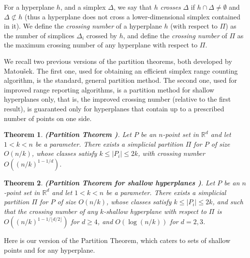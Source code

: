 \documentclass[11pt]{article}
\newtheorem{theorem}{Theorem}[section]
\def\reals{\mathbb R}
\begin{document}
For a hyperplane $h$, and a simplex $\Delta$, we say that $h$ \emph{crosses} $\Delta$ if $h \cap \Delta \neq \emptyset$ and $\Delta \not \subset h$ (thus a hyperplane does not cross a lower-dimensional simplex contained in it). We define the \emph{crossing number} of a hyperplane $h$ (with respect to $\Pi$) as the number of simplices $\Delta_{i}$ crossed by $h$, and define the \emph{crossing number} of $\Pi$ as the maximum crossing number of any hyperplane with respect to $\Pi$.


We recall two previous versions of the partition theorems, both developed by Matou\v{s}ek. The first one, used for obtaining an efficient simplex range counting algorithm, is the standard, general partition method. The second one, used for improved range reporting algorithms, is a partition method for shallow hyperplanes only, that is, the improved crossing number (relative to the first result), is guaranteed only for hyperplanes that contain up to a prescribed number of points on one side.

\begin{theorem} \label{thm_matousek_general}
\emph{{\bf(Partition Theorem \cite{mat92a})}}.
Let $P$ be an $n$-point set in $\reals^{d}$ and let $1 < k < n$ be a parameter. There exists a simplicial partition $\Pi$ for $P$ of size $O(n/k)$, whose classes satisfy $k \leq |P_{i}| \leq 2k$, with crossing number $O((n/k)^{1-1/d})$.
\end{theorem}

\begin{theorem} \label{thm_matousek_shallow}
\emph{{\bf(Partition Theorem for shallow hyperplanes \cite{mat92b})}}.
Let $P$ be an $n$-point set in $\reals^{d}$ and let $1< k < n$ be a parameter. There exists a simplicial partition $\Pi$ for $P$ of size $O(n/k)$, whose classes satisfy $k \leq |P_{i}| \leq 2k$, and such that the crossing number of any $k$-shallow hyperplane with respect to $\Pi$ is $O((n/k)^{1-1/ \lfloor d/2 \rfloor})$ for $d \geq 4$, and $O(\log (n/k))$ for $d = 2,3$.
\end{theorem}



Here is our version of the Partition Theorem, which caters to sets of shallow points and for any hyperplane.
\end{document}
